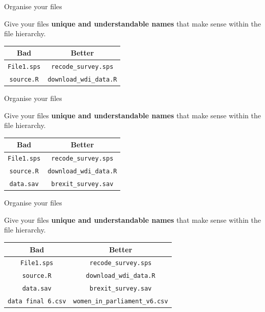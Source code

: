 \documentclass[10pt]{beamer}
\begin{document}
\begin{frame}{Organise your files}

    Give your files \textbf{unique and understandable names} that make sense within the file hierarchy.

    \begin{table}
        \begin{tabular}{c c}
        \hline
        Bad & Better \\
        \hline\hline
        \texttt{File1.sps} & \texttt{recode\_survey.sps} \\
        \texttt{source.R} & \texttt{download\_wdi\_data.R} \\
        \hline
        \end{tabular}
    \end{table}

\end{frame}

\begin{frame}{Organise your files}

    Give your files \textbf{unique and understandable names} that make sense within the file hierarchy.

    \begin{table}
        \begin{tabular}{c c}
        \hline
        Bad & Better \\
        \hline\hline
        \texttt{File1.sps} & \texttt{recode\_survey.sps} \\
        \texttt{source.R} & \texttt{download\_wdi\_data.R} \\
        \texttt{data.sav} & \texttt{brexit\_survey.sav} \\
        \hline
        \end{tabular}
    \end{table}

\end{frame}

\begin{frame}{Organise your files}

    Give your files \textbf{unique and understandable names} that make sense within the file hierarchy.

    \begin{table}
        \begin{tabular}{c c}
        \hline
        Bad & Better \\
        \hline\hline
        \texttt{File1.sps} & \texttt{recode\_survey.sps} \\
        \texttt{source.R} & \texttt{download\_wdi\_data.R} \\
        \texttt{data.sav} & \texttt{brexit\_survey.sav} \\
        \texttt{data final 6.csv} & \texttt{women\_in\_parliament\_v6.csv} \\
        \hline
        \end{tabular}
    \end{table}

\end{frame}
\end{document}
